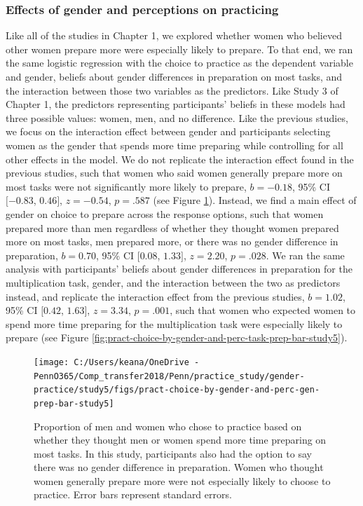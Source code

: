 \documentclass[a4paper, nobind]{templates/ociamthesis}
\begin{document}
\hypertarget{effects-of-gender-and-perceptions-on-practicing-4}{%
\subsubsection{Effects of gender and perceptions on practicing}\label{effects-of-gender-and-perceptions-on-practicing-4}}

Like all of the studies in Chapter 1, we explored whether women who believed other women prepare more were especially likely to prepare. To that end, we ran the same logistic regression with the choice to practice as the dependent variable and gender, beliefs about gender differences in preparation on most tasks, and the interaction between those two variables as the predictors. Like Study 3 of Chapter 1, the predictors representing participants' beliefs in these models had three possible values: women, men, and no difference. Like the previous studies, we focus on the interaction effect between gender and participants selecting women as the gender that spends more time preparing while controlling for all other effects in the model. We do not replicate the interaction effect found in the previous studies, such that women who said women generally prepare more on most tasks were not significantly more likely to prepare, \(b = -0.18\), 95\% CI \([-0.83\), \(0.46]\), \(z = -0.54\), \(p = .587\) (see Figure \ref{fig:pract-choice-by-gender-and-perc-gen-prep-bar-study5}). Instead, we find a main effect of gender on choice to prepare across the response options, such that women prepared more than men regardless of whether they thought women prepared more on most tasks, men prepared more, or there was no gender difference in preparation, \(b = 0.70\), 95\% CI \([0.08\), \(1.33]\), \(z = 2.20\), \(p = .028\). We ran the same analysis with participants' beliefs about gender differences in preparation for the multiplication task, gender, and the interaction between the two as predictors instead, and replicate the interaction effect from the previous studies, \(b = 1.02\), 95\% CI \([0.42\), \(1.63]\), \(z = 3.34\), \(p = .001\), such that women who expected women to spend more time preparing for the multiplication task were especially likely to prepare (see Figure \ref{fig:pract-choice-by-gender-and-perc-task-prep-bar-study5}).

\begin{figure}

{\centering \texttt{[image: C:/Users/keana/OneDrive - PennO365/Comp\_transfer2018/Penn/practice\_study/gender-practice/study5/figs/pract-choice-by-gender-and-perc-gen-prep-bar-study5]} 

}

\caption{Proportion of men and women who chose to practice based on whether they thought men or women spend more time preparing on most tasks. In this study, participants also had the option to say there was no gender difference in preparation. Women who thought women generally prepare more were not especially likely to choose to practice. Error bars represent standard errors.}\label{fig:pract-choice-by-gender-and-perc-gen-prep-bar-study5}
\end{figure}
\end{document}
